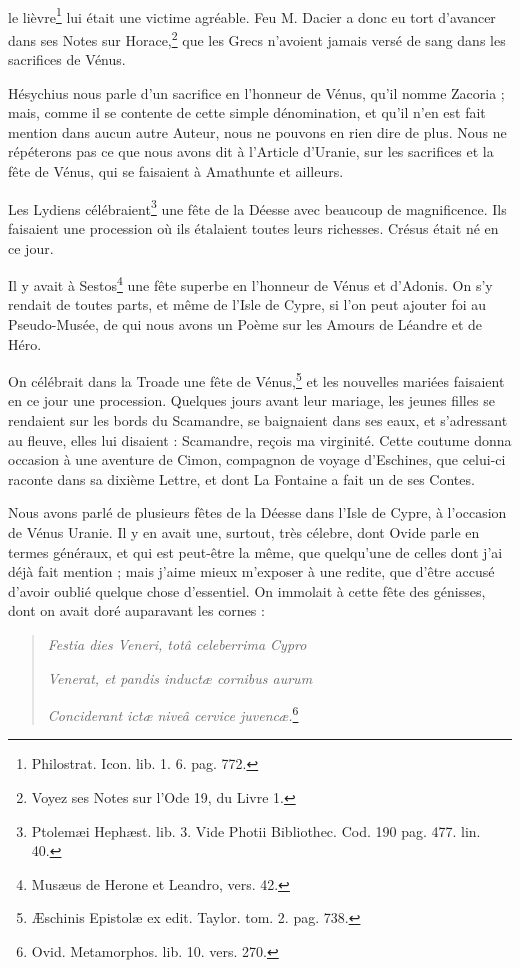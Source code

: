 \documentclass[a4paper, 11pt, oneside, polutonikogreek, french]{article}
\begin{document}
\paragraph{}
le lièvre\footnote{Philostrat. Icon. lib. 1. 6. pag. 772.} lui était une victime agréable. Feu M. Dacier a donc eu tort d'avancer dans ses Notes sur Horace,\footnote{Voyez ses Notes sur l'Ode 19, du Livre 1.} que les Grecs n'avoient jamais versé de sang dans les sacrifices de Vénus.

Hésychius nous parle d'un sacrifice en l'honneur de Vénus, qu'il nomme Zacoria ; mais, comme il se contente de cette simple dénomination, et qu'il n'en est fait mention dans aucun autre Auteur, nous ne pouvons en rien dire de plus. Nous ne répéterons pas ce que nous avons dit à l'Article d'Uranie, sur les sacrifices et la fête de Vénus, qui se faisaient à Amathunte et ailleurs.

Les Lydiens célébraient\footnote{Ptolemæi Hephæst. lib. 3. Vide Photii Bibliothec. Cod. 190 pag. 477. lin. 40.} une fête de la Déesse avec beaucoup de magnificence. Ils faisaient une procession où ils étalaient toutes leurs richesses. Crésus était né en ce jour.

Il y avait à Sestos\footnote{Musæus de Herone et Leandro, vers. 42.} une fête superbe en l'honneur de Vénus et d'Adonis. On s'y rendait de toutes parts, et même de l'Isle de Cypre, si l'on peut ajouter foi au Pseudo-Musée, de qui nous avons un Poème sur les Amours de Léandre et de Héro.

On célébrait dans la Troade une fête de Vénus,\footnote{Æschinis Epistolæ ex edit. Taylor. tom. 2. pag. 738.} et les nouvelles mariées faisaient en ce jour une procession. Quelques jours avant leur mariage, les jeunes filles se rendaient sur les bords du Scamandre, se baignaient dans ses eaux, et s'adressant au fleuve, elles lui disaient : Scamandre, reçois ma virginité. Cette coutume donna occasion à une aventure de Cimon, compagnon de voyage d'Eschines, que celui-ci raconte dans sa dixième Lettre, et dont La Fontaine a fait un de ses Contes.

Nous avons parlé de plusieurs fêtes de la Déesse dans l'Isle de Cypre, à l'occasion de Vénus Uranie. Il y en avait une, surtout, très célebre, dont Ovide parle en termes généraux, et qui est peut-être la même, que quelqu'une de celles dont j'ai déjà fait mention ; mais j'aime mieux m'exposer à une redite, que d'être accusé d'avoir oublié quelque chose d'essentiel. On immolait à cette fête des génisses, dont on avait doré auparavant les cornes :
\begin{quotation}
\emph{Festia dies Veneri, totâ celeberrima Cypro}

\emph{Venerat, et pandis inductæ cornibus aurum}

\emph{Conciderant ictæ niveâ cervice juvencæ.}\footnote{Ovid. Metamorphos. lib. 10. vers. 270.}
\end{quotation}
\end{document}
